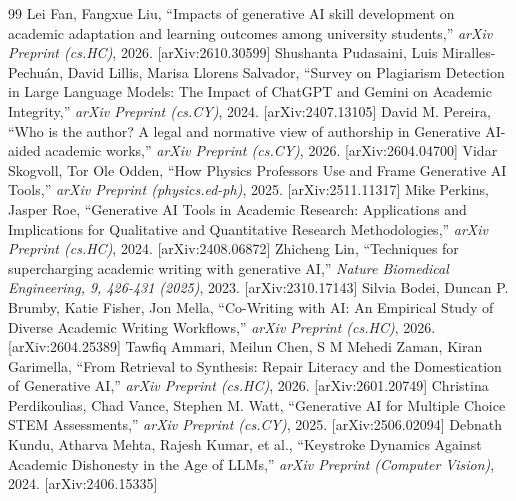 \documentclass[10pt,twocolumn,letterpaper]{article}
\begin{document}
\begin{thebibliography}{99}
 Lei Fan, Fangxue Liu, ``Impacts of generative AI skill development on academic adaptation and learning outcomes among university students,'' \textit{arXiv Preprint (cs.HC)}, 2026. [arXiv:2610.30599]
 Shushanta Pudasaini, Luis Miralles-Pechuán, David Lillis, Marisa Llorens Salvador, ``Survey on Plagiarism Detection in Large Language Models: The Impact of ChatGPT and Gemini on Academic Integrity,'' \textit{arXiv Preprint (cs.CY)}, 2024. [arXiv:2407.13105]
 David M. Pereira, ``Who is the author? A legal and normative view of authorship in Generative AI-aided academic works,'' \textit{arXiv Preprint (cs.CY)}, 2026. [arXiv:2604.04700]
 Vidar Skogvoll, Tor Ole Odden, ``How Physics Professors Use and Frame Generative AI Tools,'' \textit{arXiv Preprint (physics.ed-ph)}, 2025. [arXiv:2511.11317]
 Mike Perkins, Jasper Roe, ``Generative AI Tools in Academic Research: Applications and Implications for Qualitative and Quantitative Research Methodologies,'' \textit{arXiv Preprint (cs.HC)}, 2024. [arXiv:2408.06872]
 Zhicheng Lin, ``Techniques for supercharging academic writing with generative AI,'' \textit{Nature Biomedical Engineering, 9, 426-431 (2025)}, 2023. [arXiv:2310.17143]
 Silvia Bodei, Duncan P. Brumby, Katie Fisher, Jon Mella, ``Co-Writing with AI: An Empirical Study of Diverse Academic Writing Workflows,'' \textit{arXiv Preprint (cs.HC)}, 2026. [arXiv:2604.25389]
 Tawfiq Ammari, Meilun Chen, S M Mehedi Zaman, Kiran Garimella, ``From Retrieval to Synthesis: Repair Literacy and the Domestication of Generative AI,'' \textit{arXiv Preprint (cs.HC)}, 2026. [arXiv:2601.20749]
 Christina Perdikoulias, Chad Vance, Stephen M. Watt, ``Generative AI for Multiple Choice STEM Assessments,'' \textit{arXiv Preprint (cs.CY)}, 2025. [arXiv:2506.02094]
 Debnath Kundu, Atharva Mehta, Rajesh Kumar, et al., ``Keystroke Dynamics Against Academic Dishonesty in the Age of LLMs,'' \textit{arXiv Preprint (Computer Vision)}, 2024. [arXiv:2406.15335]
\end{thebibliography}
\end{document}
